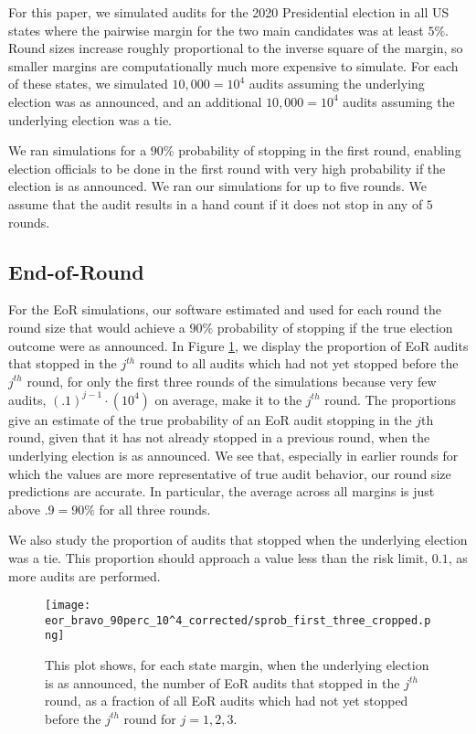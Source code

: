 For this paper, we simulated audits for 
the 2020 Presidential election
in all US states where the pairwise margin for the two main candidates was at least $5\%$. 
Round sizes increase roughly proportional to the inverse
square of the margin, so 
smaller margins are computationally much more expensive to simulate.
For each of these states, we simulated 
$10,000=10^4$ audits assuming the underlying election was as announced,  
and an additional $10,000=10^4$ audits assuming the underlying election was a tie. 

We ran simulations for a $90\%$ probability of stopping in the first round, enabling election officials to be done in the first round with very high probability if the election is as announced.
We ran our simulations for up to five rounds. We assume that the audit results in a hand count if it does not stop in any of $5$ rounds. 

\subsection{End-of-Round \BRAVO}
For the EoR \BRAVO simulations, our software estimated and used for each round
the round size that would achieve a $90\%$ probability of stopping if the true election outcome were as announced. In Figure \ref{fig:eor_bravo_sprob}, we display the proportion of EoR \BRAVO audits that stopped in the $j^{th}$ round
to all audits which had not yet stopped before the $j^{th}$ round, for only the first three rounds of the simulations because very few audits, $(.1)^{j-1}\cdot(10^4)$ on average, 
make it to the $j^{th}$ round. The proportions give an estimate
of the true probability of an EoR \BRAVO audit stopping in the $j$th round,
given that it has not already stopped in a previous round, when the underlying election is as announced. 
We see that, especially in earlier rounds for which 
the values are more representative of true audit behavior, 
our round size predictions are accurate.
In particular, the average across all margins is just above $.9=90\%$ for
all three rounds.

We also study the proportion of audits that stopped when the underlying election was a tie.
This proportion should approach a value less than the risk limit, $0.1$, as more audits are performed.

\begin{figure}
\texttt{[image: eor\_bravo\_90perc\_10^4\_corrected/sprob\_first\_three\_cropped.png]}\caption{
This plot shows, for each state margin, when the underlying election is as announced, the number of EoR \BRAVO audits that stopped in the $j^{th}$ round,
as a fraction of all EoR \BRAVO audits which had not yet stopped before the $j^{th}$ round for $j=1,2,3$.}
\label{fig:eor_bravo_sprob}
\end{figure}


